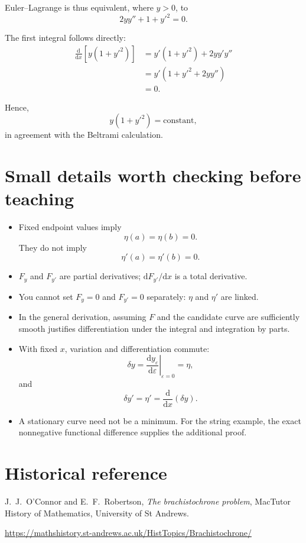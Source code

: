 \documentclass[11pt,a4paper]{article}
\newcommand{\dd}{\mathrm{d}}
\begin{document}
Euler--Lagrange is thus equivalent, where \(y>0\), to
\[
\boxed{2yy''+1+y'^2=0.}
\]

The first integral follows directly:
\begin{align*}
\frac{\dd}{\dd x}\left[y(1+y'^2)\right]
&=
y'(1+y'^2)+2yy'y''\\
&=
y'\left(1+y'^2+2yy''\right)\\
&=
0.
\end{align*}

Hence,
\[
y(1+y'^2)=\text{constant},
\]
in agreement with the Beltrami calculation.

\section*{Small details worth checking before teaching}

\begin{itemize}
\item Fixed endpoint values imply
\[
\eta(a)=\eta(b)=0.
\]
They do not imply
\[
\eta'(a)=\eta'(b)=0.
\]

\item \(F_y\) and \(F_{y'}\) are partial derivatives;
\(\dd F_{y'}/\dd x\) is a total derivative.

\item You cannot set \(F_y=0\) and \(F_{y'}=0\) separately:
\(\eta\) and \(\eta'\) are linked.

\item In the general derivation, assuming \(F\) and the candidate
curve are sufficiently smooth justifies differentiation under
the integral and integration by parts.

\item With fixed \(x\), variation and differentiation commute:
\[
\delta y
=
\left.
\frac{\dd y_\varepsilon}{\dd\varepsilon}
\right|_{\varepsilon=0}
=
\eta,
\]
and
\[
\delta y'
=
\eta'
=
\frac{\dd}{\dd x}(\delta y).
\]

\item A stationary curve need not be a minimum.
For the string example, the exact nonnegative functional
difference supplies the additional proof.
\end{itemize}

\section*{Historical reference}

J.~J.~O'Connor and E.~F.~Robertson,
\emph{The brachistochrone problem},
MacTutor History of Mathematics, University of St Andrews.

\url{https://mathshistory.st-andrews.ac.uk/HistTopics/Brachistochrone/}
\end{document}
